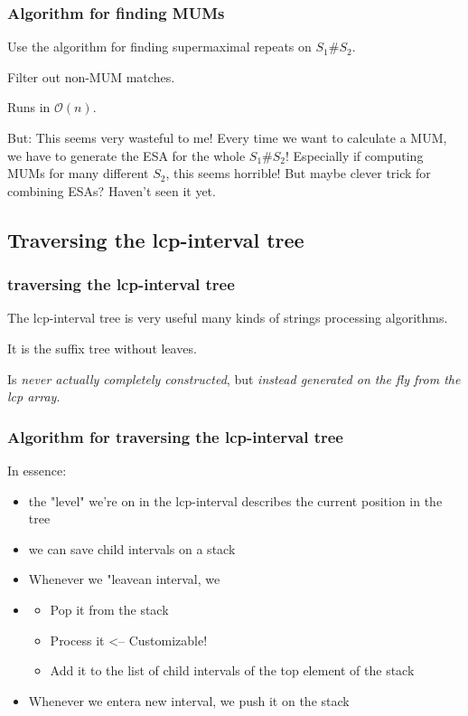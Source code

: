 \documentclass[compress,handout]{beamer} %
\renewcommand{\O}{\mathcal{O}}
\begin{document}
\begin{frame}
	\frametitle{Algorithm for finding MUMs}
	Use the algorithm for finding supermaximal repeats on $S_1\#S_2$.

	Filter out non-MUM matches.

	Runs in $\O(n)$.

	But: This seems very wasteful to me! Every time we want to
	calculate a MUM, we have to generate the ESA for the whole
	$S_1\#S_2$! Especially if computing MUMs for many different
	$S_2$, this seems horrible! But maybe clever trick for combining
	ESAs? Haven't seen it yet.
\end{frame}

\subsection{Traversing the lcp-interval tree}

\begin{frame}
	\frametitle{traversing the lcp-interval tree}
	The lcp-interval tree is very useful many kinds of strings
	processing algorithms.

	It is the suffix tree without leaves.

	Is {\em{never actually completely constructed}}, but {\em{instead
	generated on the fly from the lcp array}}.
\end{frame}

\begin{frame}
	\frametitle{Algorithm for traversing the lcp-interval tree}
	In essence:

	\begin{itemize}
		\item the "level" we're on in the lcp-interval describes the current position in the tree
		\item we can save child intervals on a stack
		\item Whenever we "leave\dq an interval, we
		\item \begin{itemize}
			\item Pop it from the stack
			\item Process it <-- Customizable!
			\item Add it to the list of child intervals of the top element of the stack
		\end{itemize}
		\item Whenever we \dq enter\dq a new interval, we push it on the stack
	\end{itemize}
\end{frame}
\end{document}
